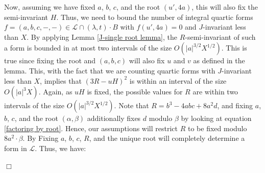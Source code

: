 \documentclass{article}
\newenvironment{proof}{\noindent {\bf Proof:}}{$\Box$ \vspace{2 ex}}
\begin{document}
\begin{proof}
Now, assuming we have fixed $a$, $b$, $c$, and the root $(u', 4a)$, this will also fix the semi-invariant $H$. Thus, we need to bound the number of integral quartic forms $f = (a, b, c, -, -) \in \mathcal{L} \cap (\lambda,t)\cdot B $ with $f(u', 4a) = 0$ and $J$-invariant less than $X$. By applying Lemma \ref{J-single root lemma}, the $R$-semi-invariant of such a form is bounded in at most two intervals of the size $O(|a|^{3/2}X^{1/2})$. This is true since fixing the root and $(a, b, c)$ will also fix $u$ and $v$ as defined in the lemma. This, with the fact that we are counting quartic forms with $J$-invariant less than $X$, implies that $(3R-uH)^2$ is within an interval of the size $O(|a|^3X)$. Again, as $uH$ is fixed, the possible values for $R$ are within two intervals of the size $O(|a|^{3/2}X^{1/2})$. Note that $R = b^3 - 4abc + 8a^2d$, and fixing $a$, $b$, $c$, and the root $(\alpha, \beta)$ additionally fixes $d$ modulo $\beta$ by looking at equation \ref{factoring by root}. Hence, our assumptions will restrict $R$ to be fixed modulo $8a^2 \cdot \beta$. By Fixing $a$, $b$, $c$, $R$, and the unique root will completely determine a form in $\mathcal{L}$. Thus, we have:


\end{proof}
\end{document}
